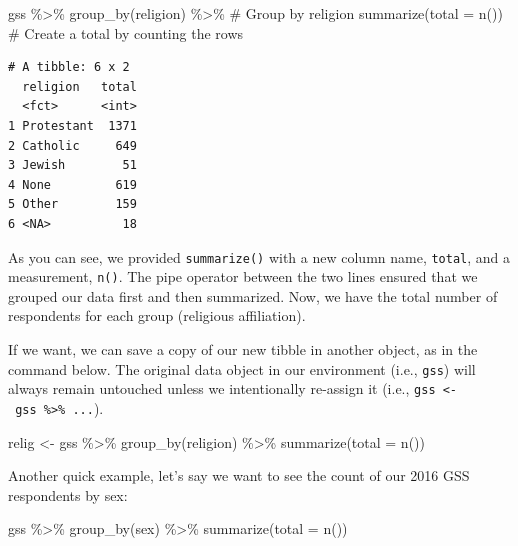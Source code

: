 \documentclass[
  letterpaper,
]{book}
\newenvironment{Shaded}{\begin{snugshade}}{\end{snugshade}}
\newcommand{\AttributeTok}[1]{\textcolor[rgb]{0.40,0.45,0.13}{#1}}
\newcommand{\CommentTok}[1]{\textcolor[rgb]{0.37,0.37,0.37}{#1}}
\newcommand{\FunctionTok}[1]{\textcolor[rgb]{0.28,0.35,0.67}{#1}}
\newcommand{\NormalTok}[1]{\textcolor[rgb]{0.00,0.23,0.31}{#1}}
\newcommand{\OtherTok}[1]{\textcolor[rgb]{0.00,0.23,0.31}{#1}}
\newcommand{\SpecialCharTok}[1]{\textcolor[rgb]{0.37,0.37,0.37}{#1}}
\begin{document}
\begin{Shaded}
\begin{Highlighting}[]
\NormalTok{gss }\SpecialCharTok{\%\textgreater{}\%}
  \FunctionTok{group\_by}\NormalTok{(religion) }\SpecialCharTok{\%\textgreater{}\%}      \CommentTok{\# Group by religion}
  \FunctionTok{summarize}\NormalTok{(}\AttributeTok{total =} \FunctionTok{n}\NormalTok{())      }\CommentTok{\# Create a total by counting the rows}
\end{Highlighting}
\end{Shaded}

\begin{verbatim}
# A tibble: 6 x 2
  religion   total
  <fct>      <int>
1 Protestant  1371
2 Catholic     649
3 Jewish        51
4 None         619
5 Other        159
6 <NA>          18
\end{verbatim}

As you can see, we provided \texttt{summarize()} with a new column name,
\texttt{total}, and a measurement, \texttt{n()}. The pipe operator
between the two lines ensured that we grouped our data first and then
summarized. Now, we have the total number of respondents for each group
(religious affiliation).

If we want, we can save a copy of our new tibble in another object, as
in the command below. The original data object in our environment (i.e.,
\texttt{gss}) will always remain untouched unless we intentionally
re-assign it (i.e.,
\texttt{gss\ \textless{}-\ gss\ \%\textgreater{}\%\ ...}).

\begin{Shaded}
\begin{Highlighting}[]
\NormalTok{relig }\OtherTok{\textless{}{-}}\NormalTok{ gss }\SpecialCharTok{\%\textgreater{}\%}
  \FunctionTok{group\_by}\NormalTok{(religion) }\SpecialCharTok{\%\textgreater{}\%}
  \FunctionTok{summarize}\NormalTok{(}\AttributeTok{total =} \FunctionTok{n}\NormalTok{())}
\end{Highlighting}
\end{Shaded}

Another quick example, let's say we want to see the count of our 2016
GSS respondents by sex:

\begin{Shaded}
\begin{Highlighting}[]
\NormalTok{gss }\SpecialCharTok{\%\textgreater{}\%}
  \FunctionTok{group\_by}\NormalTok{(sex) }\SpecialCharTok{\%\textgreater{}\%}
  \FunctionTok{summarize}\NormalTok{(}\AttributeTok{total =} \FunctionTok{n}\NormalTok{())}
\end{Highlighting}
\end{Shaded}
\end{document}
